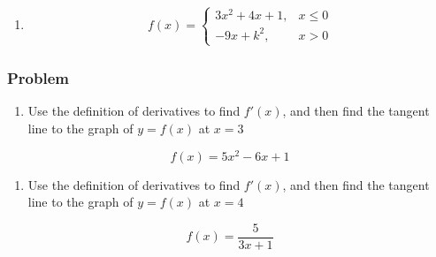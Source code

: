 \documentclass[
  letterpaper,
  DIV=11,
  numbers=noendperiod]{scrartcl}
\providecommand{\tightlist}{%
  \setlength{\itemsep}{0pt}\setlength{\parskip}{0pt}}\usepackage{longtable,booktabs,array}
\begin{document}
\begin{enumerate}
\def\labelenumi{\alph{enumi}.}
\setcounter{enumi}{1}
\tightlist
\item
  \begin{align*}
  f(x) =
   \left\{\begin{array}{lr}
     3x^2 + 4x + 1, & x \le 0 \\
    - 9x + k^2, & x > 0
  \end{array}\right.
  \end{align*}
\end{enumerate}

\hfill\break
\hfill\break
\hfill\break
\hfill\break

\hfill\break
\hfill\break
\hfill\break
\hfill\break

\thispagestyle{empty}

\subsubsection{Problem}\label{problem-3}

\begin{enumerate}
\def\labelenumi{\alph{enumi}.}
\tightlist
\item
  Use the definition of derivatives to find \(f'(x)\), and then find the
  tangent line to the graph of \(y = f(x)\) at \(x = 3\)
\end{enumerate}

\[
f(x) = 5x^2 - 6x + 1
\]

\hfill\break
\hfill\break
\hfill\break
\hfill\break

\hfill\break
\hfill\break
\hfill\break
\hfill\break

\hfill\break
\hfill\break
\hfill\break
\hfill\break

\hfill\break
\hfill\break
\hfill\break
\hfill\break

\thispagestyle{empty}

\begin{enumerate}
\def\labelenumi{\alph{enumi}.}
\setcounter{enumi}{1}
\tightlist
\item
  Use the definition of derivatives to find \(f'(x)\), and then find the
  tangent line to the graph of \(y = f(x)\) at \(x = 4\)
\end{enumerate}

\[
f(x) = \frac{5}{3x+1}
\]\\
\strut \\
\strut \\
\strut \\
\end{document}

